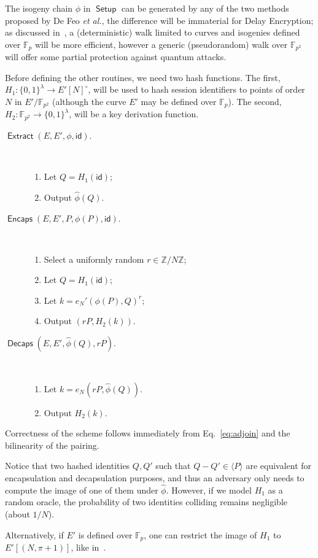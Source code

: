 \documentclass{llncs}
\newcommand{\Z}{\mathbb{Z}}
\newcommand{\F}{\mathbb{F}}
\DeclareMathOperator{\Setup}{\mathsf{Setup}}
\DeclareMathOperator{\Extract}{\mathsf{Extract}}
\DeclareMathOperator{\Encaps}{\mathsf{Encaps}}
\DeclareMathOperator{\Decaps}{\mathsf{Decaps}}
\newcommand{\id}{\mathsf{id}}
\begin{document}
The isogeny chain $\phi$ in $\Setup$ can be generated by any of the
two methods proposed by De Feo \emph{et al.}, the difference will be
immaterial for Delay Encryption; as discussed
in~\cite{10.1007/978-3-030-34578-5_10}, a (deterministic) walk limited
to curves and isogenies defined over $\F_p$ will be more efficient,
however a generic (pseudorandom) walk over $\F_{p^2}$ will offer some
partial protection against quantum attacks.

Before defining the other routines, we need two hash functions. %
The first, $H_1:\{0,1\}^\lambda\to E'[N]^\circ$, will be used to hash session
identifiers to points of order $N$ in $E'/\F_{p^2}$ (although the
curve $E'$ may be defined over $\F_p$). %
The second, $H_2:\F_{p^2}\to\{0,1\}^\lambda$, will be a key derivation
function. %

\begin{description}
\item[$\Extract(E,E',\phi,\id)$.]\
  \begin{enumerate}
  \item Let $Q = H_1(\id)$;
  \item Output $\hat\phi(Q)$.
  \end{enumerate}
\item[$\Encaps(E,E',P,\phi(P),\id)$.]\
  \begin{enumerate}
  \item Select a uniformly random $r\in\Z/N\Z$;
  \item Let $Q = H_1(\id)$;
  \item Let $k=e_N'(\phi(P),Q)^r$;
  \item Output $(rP,H_2(k))$.
  \end{enumerate}
\item[$\Decaps(E,E',\hat\phi(Q),rP)$.]\
  \begin{enumerate}
  \item Let $k = e_N(rP,\hat\phi(Q))$.
  \item Output $H_2(k)$.
  \end{enumerate}
\end{description}

Correctness of the scheme follows immediately from
Eq.~\eqref{eq:adjoin} and the bilinearity of the pairing. %

\begin{remark}
  Notice that two hashed identities $Q,Q'$ such that
  $Q-Q'\in \langle P\rangle$ are equivalent for encapsulation and
  decapsulation purposes, and thus an adversary only needs to compute
  the image of one of them under $\hat\phi$. %
  However, if we model $H_1$ as a random oracle, the probability of
  two identities colliding remains negligible (about $1/N$).
  
  Alternatively, if $E'$ is defined over $\F_p$, one can restrict the
  image of $H_1$ to $E'[(N,\pi+1)]$, like
  in~\cite{10.1007/978-3-030-34578-5_10}.
\end{remark}
\end{document}
